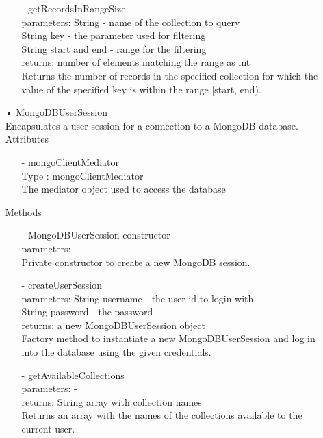 \documentclass[oneside, english, final]{design}
\begin{document}
\begin{itemize}
\begin{itemize}
		      \item[-]getRecordsInRangeSize
		            \\parameters: String - name of the collection to query
		            \\String key - the parameter used for filtering
		            \\String start and end - range for the filtering
		            \\returns: number of elements matching the range as int
		            \\Returns the number of records in the specified
		            collection for which the value of the specified
		            key is within the range [start, end).
	      \end{itemize}


	\newpage
	\item[•]MongoDBUserSession
	      \\Encapsulates a user session for a connection to a MongoDB database.
	      \\Attributes
	      \begin{itemize}
		      \item[-]mongoClientMediator
		            \\Type : mongoClientMediator
		            \\The mediator object used to access the database
	      \end{itemize}
	      Methods
	      \begin{itemize}
		      \item[-]MongoDBUserSession constructor
		            \\parameters: -
		            \\Private constructor to create a new MongoDB session.

		      \item[-]createUserSession
		            \\parameters: String username - the user id to login with
		            \\String password - the password
		            \\returns: a new MongoDBUserSession object
		            \\Factory method to instantiate a new MongoDBUserSession and log in into the database using the given credentials.

		      \item[-]getAvailableCollections
		            \\parameters: -
		            \\returns: String array with collection names
		            \\Returns an array with the names of the collections available to the current user.


\end{itemize}
\end{itemize}
\end{document}
